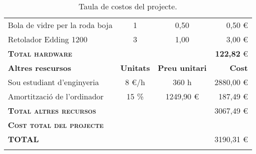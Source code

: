 \begin{longtable}{@{\extracolsep{\fill}} lccr}
	Bola de vidre per la roda boja & 1 & 0,50 & 0,50 \euro \\
	Retolador Edding 1200 & 3 & 1,00 & 3,00 \euro \\
	\midrule
	\textsc{\textbf{Total hardware}}         && & \textbf{122,82} \euro\\
	\toprule
	\textbf{Altres rescursos} & \textbf{Unitats} & \textbf{Preu unitari} & \textbf{Cost} \\
	\midrule
	Sou estudiant d'enginyeria & 8 \euro/h & 360 h & 2880,00 \euro \\
	Amortització de l'ordinador & 15 \% & 1249,90 \euro & 187,49 \euro \\
	\midrule
	\textsc{\textbf{Total altres recursos}}  & & & 3067,49 \euro\\
	\toprule
	\toprule
	\textbf{\textsc{Cost total del projecte}} & \\
	\toprule
	\toprule
	\textbf{TOTAL} &&& 3190,31 \euro \\
	\bottomrule    
	\caption{Taula de costos del projecte.}            
\end{longtable}

